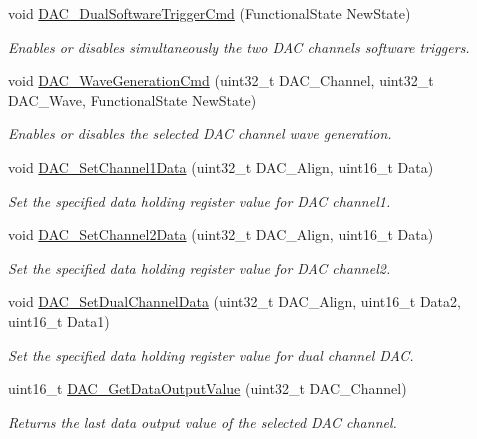 \begin{DoxyCompactItemize}
void \hyperlink{group___d_a_c_gab4d3b364a6b184dcd65f3b294ebf56dc}{D\-A\-C\-\_\-\-Dual\-Software\-Trigger\-Cmd} (Functional\-State New\-State)
\begin{DoxyCompactList}\small\item\em Enables or disables simultaneously the two D\-A\-C channels software triggers. \end{DoxyCompactList}\item 
void \hyperlink{group___d_a_c_gabd51ae6880821d4dcd923969ec19a19e}{D\-A\-C\-\_\-\-Wave\-Generation\-Cmd} (uint32\-\_\-t D\-A\-C\-\_\-\-Channel, uint32\-\_\-t D\-A\-C\-\_\-\-Wave, Functional\-State New\-State)
\begin{DoxyCompactList}\small\item\em Enables or disables the selected D\-A\-C channel wave generation. \end{DoxyCompactList}\item 
void \hyperlink{group___d_a_c_gad06b4230d2b17d1d13f41dce4c782461}{D\-A\-C\-\_\-\-Set\-Channel1\-Data} (uint32\-\_\-t D\-A\-C\-\_\-\-Align, uint16\-\_\-t Data)
\begin{DoxyCompactList}\small\item\em Set the specified data holding register value for D\-A\-C channel1. \end{DoxyCompactList}\item 
void \hyperlink{group___d_a_c_ga44e12006ec186791378d132da8541552}{D\-A\-C\-\_\-\-Set\-Channel2\-Data} (uint32\-\_\-t D\-A\-C\-\_\-\-Align, uint16\-\_\-t Data)
\begin{DoxyCompactList}\small\item\em Set the specified data holding register value for D\-A\-C channel2. \end{DoxyCompactList}\item 
void \hyperlink{group___d_a_c_ga4ca2cfdf56ab35a23f2517f23d7fbb24}{D\-A\-C\-\_\-\-Set\-Dual\-Channel\-Data} (uint32\-\_\-t D\-A\-C\-\_\-\-Align, uint16\-\_\-t Data2, uint16\-\_\-t Data1)
\begin{DoxyCompactList}\small\item\em Set the specified data holding register value for dual channel D\-A\-C. \end{DoxyCompactList}\item 
uint16\-\_\-t \hyperlink{group___d_a_c_ga51274838de1e5dd012a82d7f44d7a50b}{D\-A\-C\-\_\-\-Get\-Data\-Output\-Value} (uint32\-\_\-t D\-A\-C\-\_\-\-Channel)
\begin{DoxyCompactList}\small\item\em Returns the last data output value of the selected D\-A\-C channel. \end{DoxyCompactList}\item 

\end{DoxyCompactItemize}
